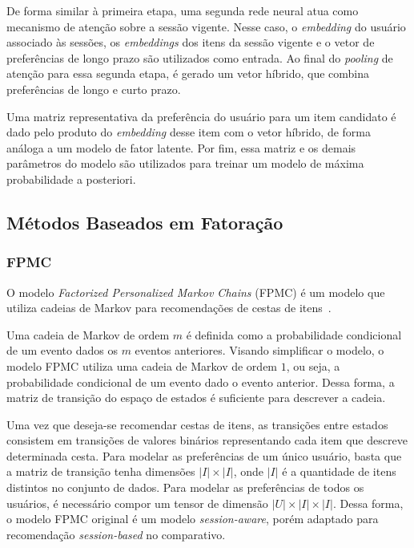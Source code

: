De forma similar à primeira etapa, uma segunda rede neural atua como mecanismo
de atenção sobre a sessão vigente. Nesse caso, o \textit{embedding} do usuário associado
às sessões, os \textit{embeddings} dos itens da sessão vigente e o vetor de
preferências de longo prazo são utilizados como entrada. Ao final do \textit{pooling}
de atenção para essa segunda etapa, é gerado um vetor híbrido, que combina
preferências de longo e curto prazo.

Uma matriz representativa da preferência do usuário para um item candidato é
dado pelo produto do \textit{embedding} desse item com o vetor híbrido, de forma
análoga a um modelo de fator latente. Por fim, essa matriz e os demais
parâmetros do modelo são utilizados para treinar um modelo de máxima
probabilidade a posteriori.

\subsection{Métodos Baseados em Fatoração}

\subsubsection{FPMC}
 O modelo
\textit{Factorized Personalized Markov Chains} (FPMC) é um modelo que utiliza
cadeias de Markov para recomendações de cestas de itens~\cite{mkv}.

Uma cadeia de Markov de ordem $m$ é definida como a probabilidade condicional de
um evento dados os $m$ eventos anteriores. Visando simplificar o modelo, o
modelo FPMC utiliza uma cadeia de Markov de ordem $1$, ou seja, a probabilidade
condicional de um evento dado o evento anterior. Dessa forma, a matriz de
transição do espaço de estados é suficiente para descrever a cadeia.

Uma vez que deseja-se recomendar cestas de itens, as transições entre estados
consistem em transições de valores binários representando cada item que descreve
determinada cesta. Para modelar as preferências de um único usuário, basta que a
matriz de transição tenha dimensões $|I| \times |I|$, onde $|I|$ é a quantidade
de itens distintos no conjunto de dados. Para modelar as preferências de todos
os usuários, é necessário compor um tensor de dimensão $|U| \times |I| \times
|I|$. Dessa forma, o modelo FPMC original é um modelo \textit{session-aware},
porém adaptado para recomendação \textit{session-based} no comparativo.

